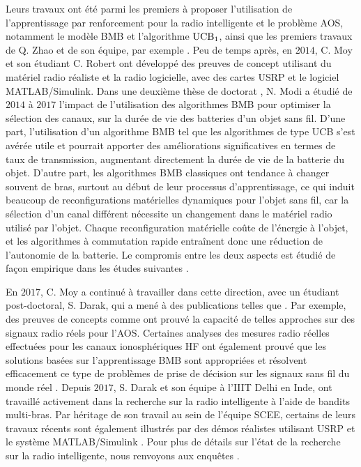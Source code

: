 \begin{resume_fr}
Leurs travaux ont été parmi les premiers à proposer l'utilisation de l'apprentissage par renforcement pour la radio intelligente et le problème AOS, notamment le modèle BMB et l'algorithme $\mathrm{UCB}_1$,
ainsi que les premiers travaux de Q. Zhao et de son équipe, par exemple \cite{Liu08,Zhao10}.
%
Peu de temps après, en $2014$, C. Moy et son étudiant C. Robert \cite{RobertSDR2014,MoyWSR2014,MoyWSR2014} ont développé des preuves de concept utilisant du matériel radio réaliste et la radio logicielle, avec des cartes USRP et le logiciel MATLAB/Simulink.
Dans une deuxième thèse de doctorat \cite{Modi17PhD}, N. Modi a étudié de $2014$ à $2017$ l'impact de l'utilisation des algorithmes BMB pour optimiser la sélection des canaux, sur la durée de vie des batteries d'un objet sans fil.
D'une part, l'utilisation d'un algorithme BMB tel que les algorithmes de type UCB s'est avérée utile et pourrait apporter des améliorations significatives en termes de taux de transmission, augmentant directement la durée de vie de la batterie du objet.
D'autre part, les algorithmes BMB classiques ont tendance à changer souvent de bras, surtout au début de leur processus d'apprentissage, ce qui induit beaucoup de reconfigurations matérielles dynamiques pour l'objet sans fil, car la sélection d'un canal différent nécessite un changement dans le matériel radio utilisé par l'objet.
Chaque reconfiguration matérielle coûte de l'énergie à l'objet, et les algorithmes à commutation rapide entraînent donc une réduction de l'autonomie de la batterie.
Le compromis entre les deux aspects est étudié de façon empirique dans les études suivantes
\cite{modiDemo2016}.


En $2017$, C. Moy a continué à travailler dans cette direction, avec un étudiant post-doctoral, S. Darak, qui a mené à des publications telles que
\cite{darak2016bayesian,Darak16}.
%
Par exemple, des preuves de concepts comme \cite{kumar2016two} ont prouvé la capacité de telles approches sur des signaux radio réels pour l'AOS.
%
Certaines analyses des mesures radio réelles effectuées pour les canaux ionosphériques HF ont également prouvé que les solutions basées sur l'apprentissage BMB sont appropriées et résolvent efficacement ce type de problèmes de prise de décision sur les signaux sans fil du monde réel \cite{Melian15}.
%
Depuis $2017$, S. Darak et son équipe à l'IIIT Delhi en Inde, ont travaillé activement dans la recherche sur la radio intelligente à l'aide de bandits multi-bras.
Par héritage de son travail au sein de l'équipe SCEE,
certains de leurs travaux récents sont également illustrés par des démos réalistes utilisant USRP et le système MATLAB/Simulink
\cite{KumarYadav2018,SawantKumar2018,JoshiKumar2018}.
%
Pour plus de détails sur l'état de la recherche sur la radio intelligente, nous renvoyons aux enquêtes \cite{garhwal2012survey,marinho2012cognitive}.



\end{resume_fr}
